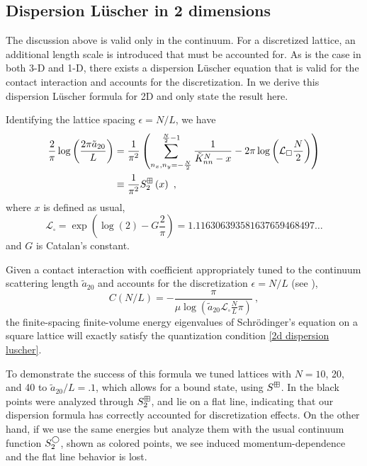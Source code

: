 \subsection{Dispersion L\"uscher in 2 dimensions}

The discussion above is valid only in the continuum.
For a discretized lattice, an additional length scale is introduced that must be accounted for.
As is the case in both 3-D and 1-D, there exists a dispersion L\"uscher equation that is valid for the contact interaction and accounts for the discretization.
In  we derive this dispersion L\"uscher formula for 2D and only state the result here.

Identifying the lattice spacing $\epsilon=N/L$, we have
\begin{align}
    \frac{2}{\pi} \log \left(\frac{2\pi \tilde a_{20}}{L}\right)
    &=
    \frac{1}{\pi^2}
    \left(
        \sum_{n_x,n_y=-\frac{N}{2}}^{\frac{N}{2}-1}\frac{1}{\tilde{K}^N_{nn}-x}
        -2\pi \log \left(\mathcal{L}_\square\frac{N}{2}\right)
    \right)
    \nonumber\\
    &\equiv\frac{1}{\pi^2}S^{\dispersion}_2\left(x\right)\ ,\label{eq:2d dispersion luscher}
\end{align}
where $x$ is defined as usual,
\begin{equation}
    \mathcal{L}_{\square}
    =
    \exp \left(\log (2)-G \frac{2}{\pi}\right)
    =
    1.116306393581637659468497 \ldots
\end{equation}
and $G$ is Catalan's constant.

Given a contact interaction with coefficient appropriately tuned to the continuum scattering length $\tilde a_{20}$ and accounts for the discretization $\epsilon=N/L$ (see ),
\begin{equation}
C(N/L)=-\frac{ \pi}{\mu \log \left(\tilde a_{20} \mathcal{L}_\square \frac{N}{L}\pi\right)}\ ,
\end{equation}
the finite-spacing finite-volume energy eigenvalues of Schr\"odinger's equation on a square lattice will exactly satisfy the quantization condition \eqref{2d dispersion luscher}.

To demonstrate the success of this formula we tuned lattices with $N=10$, 20, and 40 to $\tilde a_{20}/L = .1$, which allows for a bound state, using $S^{\boxplus}$.
In  the black points were analyzed through $S^\boxplus_2$, and lie on a flat line, indicating that our dispersion \Luscher formula has correctly accounted for discretization effects.
On the other hand, if we use the same energies but analyze them with the usual continuum \Luscher function $S^{\bigcirc}_2$, shown as colored points, we see induced momentum-dependence and the flat line behavior is lost.

